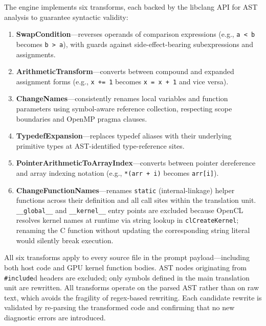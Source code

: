 \documentclass{article}
\begin{document}
The engine implements six transforms, each backed by the libclang API for AST analysis to guarantee syntactic validity:
\begin{enumerate}
    \item \textbf{SwapCondition}---reverses operands of comparison expressions (e.g., \texttt{a < b} becomes \texttt{b > a}), with guards against side-effect-bearing subexpressions and assignments.
    
    \item \textbf{ArithmeticTransform}---converts between compound and expanded assignment forms (e.g., \texttt{x += 1} becomes \texttt{x = x + 1} and vice versa). 
    
    \item \textbf{ChangeNames}---consistently renames local variables and function parameters using symbol-aware reference collection, respecting scope boundaries and OpenMP pragma clauses.
    
    \item \textbf{TypedefExpansion}---replaces typedef aliases with their underlying primitive types at AST-identified type-reference sites.
    \item \textbf{PointerArithmeticToArrayIndex}---converts between pointer dereference and array indexing notation (e.g., \texttt{*(arr + i)} becomes \texttt{arr[i]}).
    
    \item \textbf{ChangeFunctionNames}---renames \texttt{static} (internal-linkage) helper functions across their definition and all call sites within the translation unit. \texttt{\_\_global\_\_} and \texttt{\_\_kernel\_\_} entry points are excluded because OpenCL resolves kernel names at runtime via string lookup in \texttt{clCreateKernel}; renaming the C function without updating the corresponding string literal would silently break execution.
\end{enumerate}

All six transforms apply to every source file in the prompt payload---including both host code and GPU kernel function bodies. AST nodes originating from \texttt{\#include}d headers are excluded; only symbols defined in the main translation unit are rewritten. All transforms operate on the parsed AST rather than on raw text, which avoids the fragility of regex-based rewriting. Each candidate rewrite is validated by re-parsing the transformed code and confirming that no new diagnostic errors are introduced. %
\end{document}
